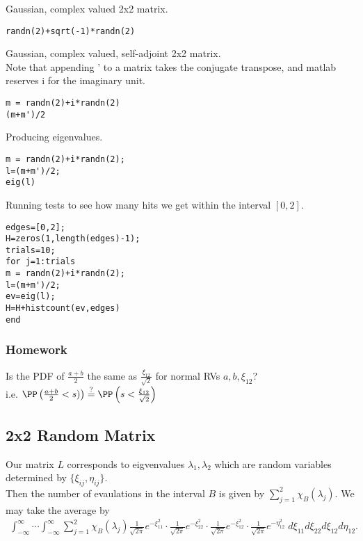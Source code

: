 \documentclass[11pt]{article}
\begin{document}
Gaussian, complex valued 2x2 matrix.\\
\begin{verbatim}
randn(2)+sqrt(-1)*randn(2)
\end{verbatim}


Gaussian, complex valued, self-adjoint 2x2 matrix.\\
Note that appending ' to a matrix takes the conjugate transpose, and matlab reserves i for the imaginary unit.\\
\begin{verbatim}
m = randn(2)+i*randn(2)
(m+m')/2
\end{verbatim}

Producing eigenvalues.\\
\begin{verbatim}
m = randn(2)+i*randn(2);
l=(m+m')/2;
eig(l)
\end{verbatim}


Running tests to see how many hits we get within the interval \([0,2]\).\\
\begin{verbatim}
edges=[0,2];
H=zeros(1,length(edges)-1);
trials=10;
for j=1:trials
m = randn(2)+i*randn(2);
l=(m+m')/2;
ev=eig(l);
H=H+histcount(ev,edges)
end
\end{verbatim}
\subsubsection*{Homework}
\label{sec:orgb562fd0}
Is the PDF of \(\frac{a+b}{2}\) the same as \(\frac{\xi_{12}}{\sqrt{2}}\) for normal RVs \(a,b,\xi_{12}\)?\\
i.e. \(\PP\left( \frac{a+b}{2}<s) \right)\overset{?}{=} \PP\left(s<\frac{\xi_{12}}{\sqrt{2}} \right)\)\\
\subsection*{2x2 Random Matrix}
\label{sec:orgb4fbd0a}
Our matrix \(L\) corresponds to eigvenvalues \(\lambda_{1},\lambda_{2}\) which are random variables determined by \(\{\xi_{ij},\eta_{ij}\}\).\\
Then the number of evaulations in the interval \(B\) is given by \(\sum_{j=1}^{2}\chi_{B}(\lambda_{j})\). We may take the average by\\
\begin{align*}
  \int_{-\infty}^{\infty}\cdots\int_{-\infty}^{\infty}\sum_{j=1}^{2}\chi_{B}(\lambda_{j})\frac{1}{\sqrt{2\pi}}e^{-\xi^{2}_{11}}\cdot\frac{1}{\sqrt{2\pi}}e^{-\xi^{2}_{22}}\cdot\frac{1}{\sqrt{2\pi}}e^{-\xi^{2}_{12}}\cdot\frac{1}{\sqrt{2\pi}}e^{-\eta^{2}_{12}}\;d\xi_{11}d\xi_{22}d\xi_{12}d\eta_{12}.
\end{align*}
\end{document}
